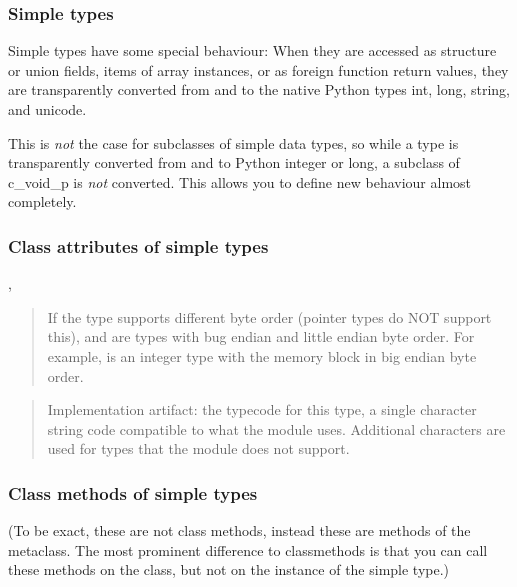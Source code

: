 \subsubsection{Simple types\label{ctypes-simple-types}}

Simple types have some special behaviour: When they are accessed as
structure or union fields, items of array instances, or as foreign
function return values, they are transparently converted from and to
the native Python types int, long, string, and unicode.

This is \emph{not} the case for subclasses of simple data types, so while a
 type is transparently converted from and to Python
integer or long, a subclass of c{\_}void{\_}p is \emph{not} converted.  This
allows you to define new behaviour almost completely.


\subsubsection{Class attributes of simple types\label{ctypes-class-attributes-of-simple-types}}

, 
\begin{quote}

If the type supports different byte order (pointer types do NOT
support this),  and  are types
with bug endian and little endian byte order.  For example,
 is an integer type with the memory block in
big endian byte order.
\end{quote}

\begin{quote}

Implementation artifact: the typecode for this type, a single
character string code compatible to what the  module uses.
Additional characters are used for types that the  module
does not support.
\end{quote}


\subsubsection{Class methods of simple types\label{ctypes-class-methods-of-simple-types}}

(To be exact, these are not class methods, instead these are methods
of the metaclass.  The most prominent difference to classmethods is
that you can call these methods on the class, but not on the instance
of the simple type.)


